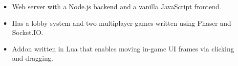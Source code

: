 \documentclass[letterpaper]{resume}
\begin{document}
\begin{minipage}[t]{0.72\columnwidth}
\vspace{2pt}
\begin{itemize}
\item Web server with a Node.js backend and a vanilla JavaScript frontend.
\item Has a lobby system and two multiplayer games written using Phaser and Socket.IO.
\end{itemize}

\sectionspace

\vspace{2pt}
\begin{itemize}
\item Addon written in Lua that enables moving in-game UI frames via clicking and dragging.
\end{itemize}

\sectionspace

\end{minipage}
\end{document}
